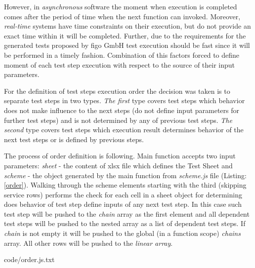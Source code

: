 However, in \textit{asynchronous} software the moment when execution is completed comes after the period of time when the next function can invoked. Moreover, \textit{real-time} systems have time constraints on their execution, but do not provide an exact time within it will be completed. Further, due to the requirements for the generated tests proposed by figo GmbH test execution should be fast since it will be performed in a timely fashion. Combination of this factors forced to define moment of each test step execution with respect to the source of their input parameters.


For the definition of test steps execution order the decision was taken is to separate test steps in two types. \textit{The first} type covers test steps which behavior does not make influence to the next steps (do not define input parameters for further test steps) and is not determined by any of previous test steps. \textit{The second} type covers test steps which execution result determines behavior of the next test steps or is defined by previous steps.

%
The process of order definition is following. Main function accepts two input parameters: \textit{sheet} - the content of xlsx file which defines the Test Sheet and \textit{scheme} - the object generated by the main function from \textit{scheme.js} file (Listing: \ref{order}). Walking through the scheme elements starting with the third (skipping service rows) performs the check for each cell in a sheet object for determining does behavior of test step define inputs of any next test step. In this case such test step will be pushed to the \textit{chain} array as the first element and all dependent test steps will be pushed to the nested array as a list of dependent test steps. If \textit{chain} is not empty it will be pushed to the global (in a function scope) \textit{chains}  array. All other rows will be pushed to the \textit{linear array}.



{code/order.js.txt}

